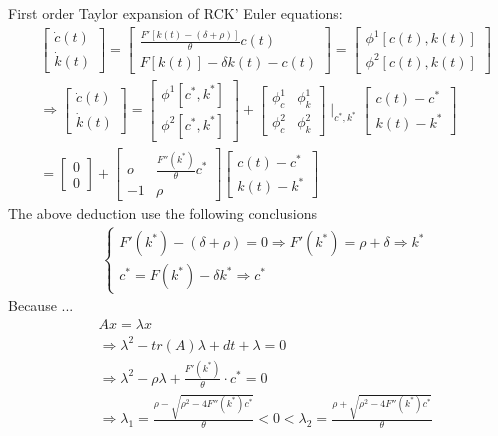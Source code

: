 \documentclass{article}
\begin{document}
First order Taylor expansion of RCK' Euler equations:
\begin{align}
& \begin{bmatrix}\dot c(t) \\ \dot k(t)\end{bmatrix}
=\begin{bmatrix} \frac{F'[k(t)-(\delta+\rho)]}{\theta} c(t) \\ F[k(t)]-\delta k(t)-c(t)\end{bmatrix}
=\begin{bmatrix}\phi^{1}[c(t),k(t)] \\ \phi^{2}[c(t),k(t)] \end{bmatrix}
\\&\Rightarrow 
\begin{bmatrix}\dot c(t) \\ \dot k(t)\end{bmatrix}
=\begin{bmatrix}\phi^{1}[c^{*},k^{*}] \\ \phi^{2}[c^{*},k^{*}] \end{bmatrix}+
\begin{bmatrix}\phi_{c}^{1} & \phi_{k}^{1} \\ \phi_{c}^{2} & \phi_{k}^{2}\end{bmatrix} \mid_{c^{*},k^{*}}
\begin{bmatrix} c(t)-c^{*} \\ k(t)-k^{*}\end{bmatrix}
\\&=\begin{bmatrix}0 \\ 0\end{bmatrix} + \begin{bmatrix}o & \frac{F''(k^{*})}{\theta} c^{*} \\ -1 & \rho\end{bmatrix} \begin{bmatrix} c(t)-c^{*} \\ k(t)-k^{*}\end{bmatrix}
\end{align}
The above deduction use the following conclusions
\begin{align}
&\begin{cases}F'(k^{*})-(\delta+\rho)=0\Rightarrow F'(k^{*})=\rho+\delta \Rightarrow k^{*}
\\c^{*}=F(k^{*})-\delta k^{*} \Rightarrow c^{*}
\end{cases}
\end{align}
Because ...
\begin{align}
&Ax=\lambda x
\\&\Rightarrow \lambda ^{2}-tr(A) \lambda+dt+\lambda =0
\\&\Rightarrow \lambda^{2}-\rho \lambda+\frac{F'(k^{*})}{\theta}\cdot c^{*}=0
\\&\Rightarrow \lambda_{1}=\frac{\rho-\sqrt{\rho^{2}-4F''(k^{*})c^{*}}}{\theta}<0<\lambda_{2}=\frac{\rho+\sqrt{\rho^{2}-4F''(k^{*})c^{*}}}{\theta}
\end{align}
\end{document}
